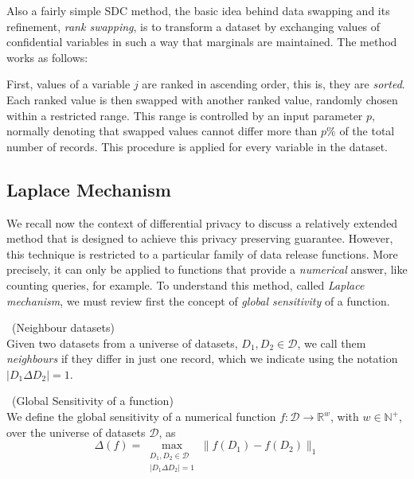 Also a fairly simple SDC method, the basic idea behind data swapping and its refinement, \textit{rank swapping}, is to transform a dataset by exchanging values of confidential variables in such a way that marginals are maintained. The method works as follows:

First, values of a variable $j$ are ranked in ascending order, this is, they are \textit{sorted}. Each ranked value is then swapped with another ranked value, randomly chosen within a restricted range. This range is controlled by an input parameter $p$, normally denoting that swapped values cannot differ more than $p\%$ of the total number of records. This procedure is applied for every variable in the dataset.

\subsection{Laplace Mechanism}
\label{Theory:SDCMethods:LaplaceMechanism}

We recall now the context of differential privacy to discuss a relatively extended method that is designed to achieve this privacy preserving guarantee. However, this technique is restricted to a particular family of data release functions. More precisely, it can only be applied to functions that provide a \textit{numerical} answer, like counting queries, for example. To understand this method, called \textit{Laplace mechanism}, we must review first the concept of \textit{global sensitivity} of a function.

\begin{definition}~(Neighbour datasets)\\
Given two datasets from a universe of datasets, $D_1, D_2 \in \mathcal{D}$, we call them \textit{neighbours} if they differ in just one record, which we indicate using the notation $|D_1 \Delta D_2| = 1$.
\end{definition}

\begin{definition}~(Global Sensitivity of a function)\\
We define the global sensitivity of a numerical function $f : \mathcal{D} \rightarrow \mathbb{R}^w$, with $w \in \mathbb{N}^+$, over the universe of datasets $\mathcal{D}$, as
\begin{equation}
\Delta(f) = \max_{\substack{D_1, D_2 \in \mathcal{D} \\ |D_1 \Delta D_2| = 1}} \lVert f(D_1) - f(D_2) \rVert_{1}
\end{equation}
\end{definition}

